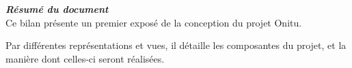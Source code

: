 \thispagestyle{empty}
\vspace*{10mm}

\textbf{\emph{\textcolor{epiBlue}{\large{Résumé du document} } } }\\

Ce bilan présente un premier exposé de la conception du projet Onitu.

Par différentes représentations et vues, il détaille les composantes du projet, et la manière dont celles-ci seront réalisées.

\newpage
